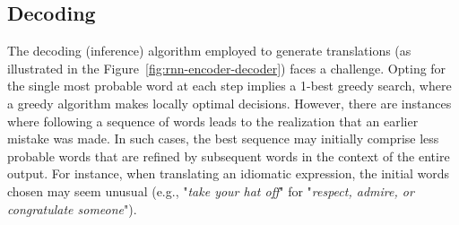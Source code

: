 \subsection{Decoding}
The decoding (inference) algorithm employed to generate translations (as illustrated in the Figure~\ref{fig:rnn-encoder-decoder}) faces a challenge. 
Opting for the single most probable word at each step implies a 1-best greedy search, where a greedy algorithm makes locally optimal decisions. 
However, there are instances where following a sequence of words leads to the realization that an earlier mistake was made. 
In such cases, the best sequence may initially comprise less probable words that are refined by subsequent words in the context of the entire output. 
For instance, when translating an idiomatic expression, the initial words chosen may seem unusual (e.g., "\textit{take your hat off}" for "\textit{respect, admire, or congratulate someone}").

